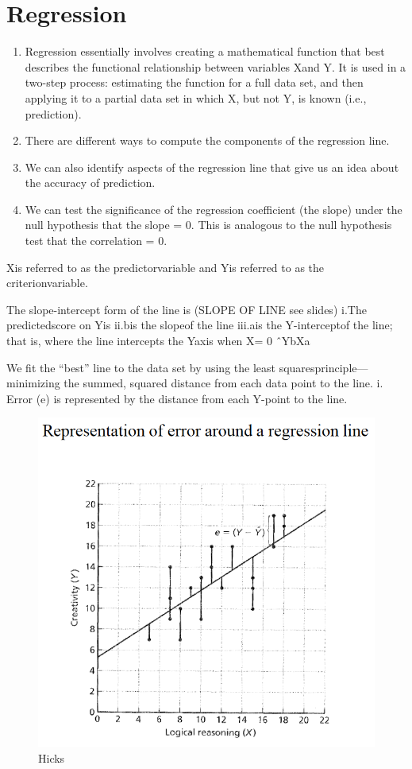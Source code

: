 \documentclass[]{book}
\providecommand{\tightlist}{%
  \setlength{\itemsep}{0pt}\setlength{\parskip}{0pt}}
\theoremstyle{definition}
\theoremstyle{definition}
\theoremstyle{definition}
\theoremstyle{remark}
\begin{document}
{\chapter{Regression}\label{regression}

\begin{enumerate}
\def\labelenumi{\arabic{enumi}.}
\tightlist
\item
  Regression essentially involves creating a mathematical function that
  best describes the functional relationship between variables Xand Y.
  It is used in a two-step process: estimating the function for a full
  data set, and then applying it to a partial data set in which X, but
  not Y, is known (i.e., prediction).
\item
  There are different ways to compute the components of the regression
  line.
\item
  We can also identify aspects of the regression line that give us an
  idea about the accuracy of prediction.
\item
  We can test the significance of the regression coefficient (the slope)
  under the null hypothesis that the slope = 0. This is analogous to the
  null hypothesis test that the correlation = 0.
\end{enumerate}

Xis referred to as the predictorvariable and Yis referred to as the
criterionvariable.

The slope-intercept form of the line is (SLOPE OF LINE see slides) i.The
predictedscore on Yis ii.bis the slopeof the line iii.ais the
Y-interceptof the line; that is, where the line intercepts the Yaxis
when X= 0 ˆYbXa

We fit the ``best'' line to the data set by using the least
squaresprinciple---minimizing the summed, squared distance from each
data point to the line. i. Error (e) is represented by the distance from
each Y-point to the line.

\begin{figure}
\centering
\includegraphics{img/hicksreg1.png}
\caption{Hicks}
\end{figure}

}
\end{document}
